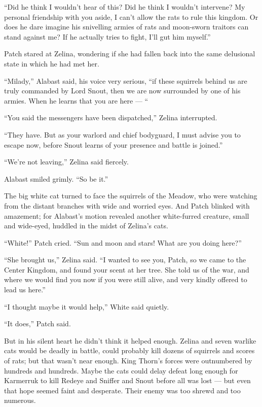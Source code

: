 \documentclass[ebook,oneside,openany,12pt]{memoir}
\begin{document}
“Did he think I wouldn’t hear of this? Did he think I wouldn’t
intervene? My personal friendship with you aside, I can’t allow the
rats to rule this kingdom. Or does he dare imagine his snivelling
armies of rats and moon-sworn traitors can stand against me? If he
actually tries to fight, I’ll gut him myself.”

Patch stared at Zelina, wondering if she had fallen back into the same
delusional state in which he had met her.

“Milady,” Alabast said, his voice very serious, “if these squirrels
behind us are truly commanded by Lord Snout, then we are now
surrounded by one of his armies. When he learns that you are here — “

“You said the messengers have been dispatched,” Zelina interrupted.

“They have. But as your warlord and chief bodyguard, I must advise you
to escape now, before Snout learns of your presence and battle is
joined.”

“We’re not leaving,” Zelina said fiercely.

Alabast smiled grimly. “So be it.”

The big white cat turned to face the squirrels of the Meadow, who were
watching from the distant branches with wide and worried eyes. And
Patch blinked with amazement; for Alabast’s motion revealed another
white-furred creature, small and wide-eyed, huddled in the midst of
Zelina’s cats.

“White!” Patch cried. “Sun and moon and stars! What are you doing
here?”

“She brought us,” Zelina said. “I wanted to see you, Patch, so we came
to the Center Kingdom, and found your scent at her tree. She told us
of the war, and where we would find you now if you were still alive,
and very kindly offered to lead us here.”

“I thought maybe it would help,” White said quietly.

“It does,” Patch said.

But in his silent heart he didn’t think it helped enough. Zelina and
seven warlike cats would be deadly in battle, could probably kill
dozens of squirrels and scores of rats; but that wasn’t near
enough. King Thorn’s forces were outnumbered by hundreds and
hundreds. Maybe the cats could delay defeat long enough for Karmerruk
to kill Redeye and Sniffer and Snout before all was lost — but even
that hope seemed faint and desperate. Their enemy was too shrewd and
too numerous.
\end{document}
